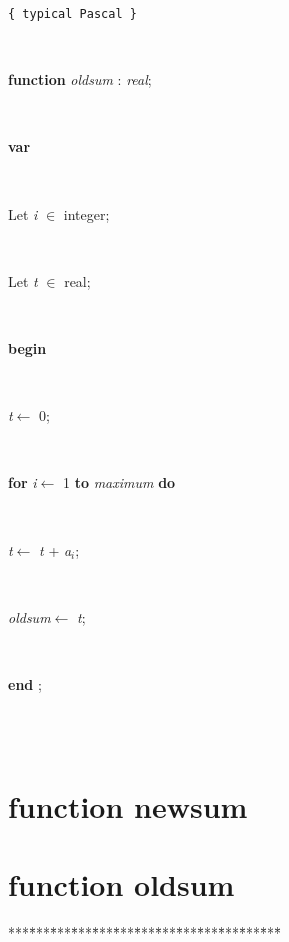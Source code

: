 \documentclass[10pt, a4paper]{article}
\begin{document}
\begin{tabbing}
\parbox{14cm}{\texttt{\small{\{ typical Pascal \}}}}\\
\parbox{14cm}{\textsf {\textbf {function } \textsf{\textit{oldsum} : \textit{real}}; }}\\
\+\parbox{14cm}{\textsf{\textbf{var} }}\\
\parbox{14cm}{\textsf{Let \textit{i} $\in$ integer;}}\\
\parbox{14cm}{\textsf{Let \textit{t} $\in$ real;}}\\
\-\<\+\parbox{14cm}{\textsf{\textbf{begin} }}\\
\parbox{14cm}{\textsf{\textit{t}$\leftarrow$ 0}; }\\
\+\parbox{14cm}{\textsf {\textbf {for } \textsf{\textit{i}$\leftarrow$ 1} \textbf{ to } \textsf{\textit{maximum}} \textbf{ do } }}\\
\-\parbox{14cm}{\textsf{\textit{t}$\leftarrow$ \textit{t} + \textit{a}$_{\textit{i}}$}; }\\
\parbox{14cm}{\textsf{\textit{oldsum}$\leftarrow$ \textit{t}}; }\\
\<\-\parbox{14cm}{\textsf{\textbf{end} ;}}\\

\\
\end{tabbing}
\section{function newsum}\label{sec:./sumsnewsum}

\section{function oldsum}\label{sec:./sumsoldsum}

\begin{tabbing}
***\=***\=***\=***\=***\=***\=***\=***\=***\=***\=***\=***\=***\=\kill
\end{tabbing}
\end{document}
